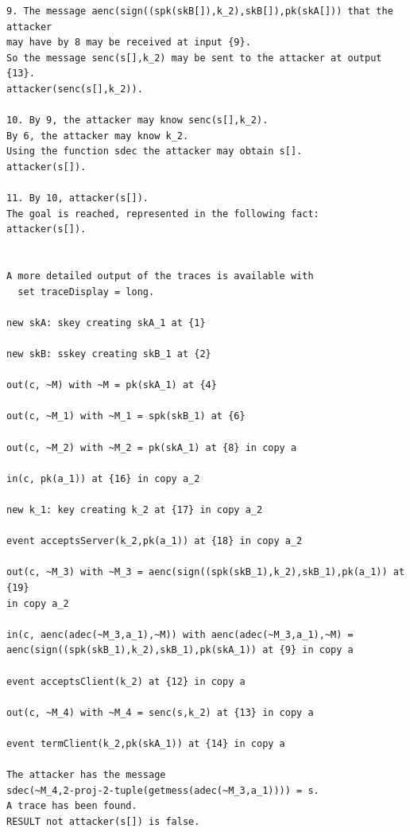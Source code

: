 \documentclass{book}
\begin{document}
\begin{lstlisting}
9. The message aenc(sign((spk(skB[]),k_2),skB[]),pk(skA[])) that the attacker
may have by 8 may be received at input {9}.
So the message senc(s[],k_2) may be sent to the attacker at output {13}.
attacker(senc(s[],k_2)).

10. By 9, the attacker may know senc(s[],k_2).
By 6, the attacker may know k_2.
Using the function sdec the attacker may obtain s[].
attacker(s[]).

11. By 10, attacker(s[]).
The goal is reached, represented in the following fact:
attacker(s[]).


A more detailed output of the traces is available with
  set traceDisplay = long.

new skA: skey creating skA_1 at {1}

new skB: sskey creating skB_1 at {2}

out(c, ~M) with ~M = pk(skA_1) at {4}

out(c, ~M_1) with ~M_1 = spk(skB_1) at {6}

out(c, ~M_2) with ~M_2 = pk(skA_1) at {8} in copy a

in(c, pk(a_1)) at {16} in copy a_2

new k_1: key creating k_2 at {17} in copy a_2

event acceptsServer(k_2,pk(a_1)) at {18} in copy a_2

out(c, ~M_3) with ~M_3 = aenc(sign((spk(skB_1),k_2),skB_1),pk(a_1)) at {19}
in copy a_2

in(c, aenc(adec(~M_3,a_1),~M)) with aenc(adec(~M_3,a_1),~M) =
aenc(sign((spk(skB_1),k_2),skB_1),pk(skA_1)) at {9} in copy a

event acceptsClient(k_2) at {12} in copy a

out(c, ~M_4) with ~M_4 = senc(s,k_2) at {13} in copy a

event termClient(k_2,pk(skA_1)) at {14} in copy a

The attacker has the message
sdec(~M_4,2-proj-2-tuple(getmess(adec(~M_3,a_1)))) = s.
A trace has been found.
RESULT not attacker(s[]) is false.

\end{lstlisting}
\end{document}
